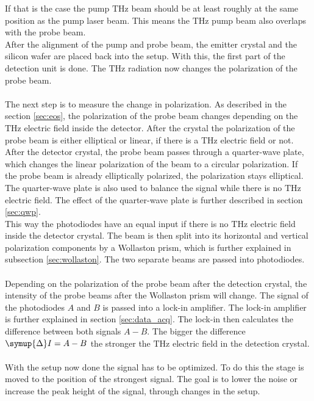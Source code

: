 If that is the case the pump $\si{\tera\hertz}$ beam should be at least roughly at the same position as the pump laser beam.
This means the $\si{\tera\hertz}$ pump beam also overlaps with the probe beam.
\\
After the alignment of the pump and probe beam, the emitter crystal and the silicon wafer are placed back into the setup.
With this, the first part of the detection unit is done.
The $\si{\tera\hertz}$ radiation now changes the polarization of the probe beam.
\\\\
The next step is to measure the change in polarization.
As described in the section \ref{sec:eos}, the polarization of the probe beam changes depending on the $\si{\tera\hertz}$ electric field inside the detector.
After the crystal the polarization of the probe beam is either elliptical or linear, if there is a $\si{\tera\hertz}$ electric field or not.
After the detector crystal, the probe beam passes through a quarter-wave plate, which changes the linear polarization of the beam to a circular polarization.
If the probe beam is already elliptically polarized, the polarization stays elliptical. 
The quarter-wave plate is also used to balance the signal while there is no $\si{\tera\hertz}$ electric field.
The effect of the quarter-wave plate is further described in section \ref{sec:qwp}.
\\
This way the photodiodes have an equal input if there is no $\si{\tera\hertz}$ electric field inside the detector crystal.
The beam is then split into its horizontal and vertical polarization components by a Wollaston prism, which is further explained in subsection \ref{sec:wollaston}.
The two separate beams are passed into photodiodes.
\\\\
Depending on the polarization of the probe beam after the detection crystal, the intensity of the probe beams after the Wollaston prism will change.
The signal of the photodiodes $A$ and $B$ is passed into a lock-in amplifier.
The lock-in amplifier is further explained in section \ref{sec:data_acq}.
The lock-in then calculates the difference between both signals $A-B$.
The bigger the difference $\symup{\Delta}I = A-B$ the stronger the $\si{\tera\hertz}$ electric field in the detection crystal.
\\\\
With the setup now done the signal has to be optimized.
To do this the stage is moved to the position of the strongest signal.
The goal is to lower the noise or increase the peak height of the signal, through changes in the setup.
